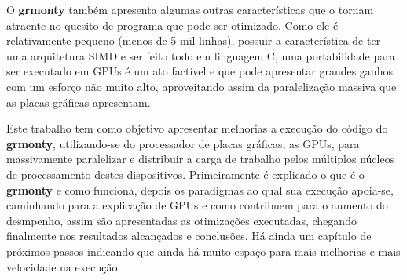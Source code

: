 O \textbf{grmonty} também apresenta algumas outras características que o tornam atraente no quesito de programa que pode ser otimizado. Como ele é relativamente pequeno (menos de 5 mil linhas), possuir a característica de ter uma arquitetura SIMD e ser feito todo em linguagem C, uma portabilidade para ser executado em GPUs é um ato factível e que pode apresentar grandes ganhos com um esforço não muito alto, aproveitando assim da paralelização massiva que as placas gráficas apresentam.

Este trabalho tem como objetivo apresentar melhorias a execução do código do \textbf{grmonty}, utilizando-se do processador de placas gráficas, as GPUs, para massivamente paralelizar e distribuir a carga de trabalho pelos múltiplos núcleos de processamento destes dispositivos. Primeiramente é explicado o que é o \textbf{grmonty} e como funciona, depois os paradigmas ao qual sua execução apoia-se, caminhando para a explicação de GPUs e como contribuem para o aumento do desmpenho, assim são apresentadas as otimizações executadas, chegando finalmente nos resultados alcançados e conclusões. Há ainda um capítulo de próximos passos indicando que ainda há muito espaço para mais melhorias e mais velocidade na execução.

%
%
%
%
%
%
%
%
